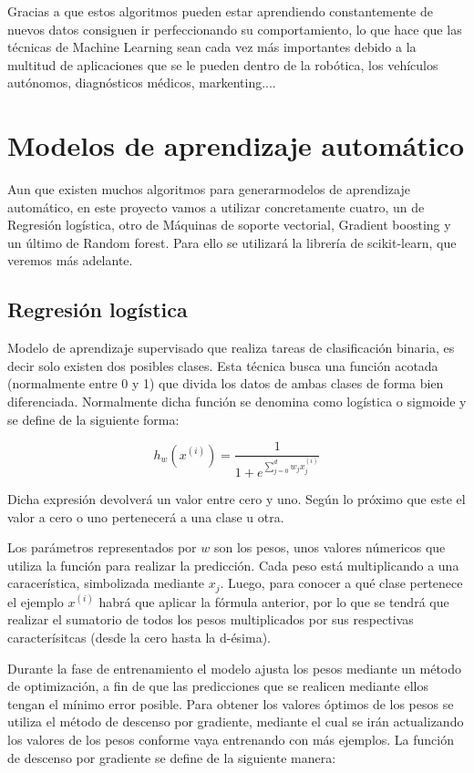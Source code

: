 \documentclass[a4paper, 12pt]{book}
\begin{document}
Gracias a que estos algoritmos pueden estar aprendiendo constantemente de nuevos datos consiguen ir perfeccionando su comportamiento, lo que hace que las técnicas de Machine Learning sean cada vez más importantes debido a la multitud de aplicaciones que se le pueden dentro de la robótica, los vehículos autónomos, diagnósticos médicos, markenting....

\section{Modelos de aprendizaje automático}
\label{sec:modelos_aautomatico}

Aun que existen muchos algoritmos para generarmodelos de aprendizaje automático, en este proyecto vamos a utilizar concretamente cuatro, un de Regresión logística, otro de Máquinas de soporte vectorial, Gradient boosting y un último de Random forest. Para ello se utilizará la librería de scikit-learn, que veremos más adelante.

\subsection{Regresión logística}
\label{subsec:regresion_logistica}

Modelo de aprendizaje supervisado que realiza tareas de clasificación binaria, es decir solo existen dos posibles clases. Esta técnica busca una función acotada (normalmente entre 0 y 1) que divida los datos de ambas clases de forma bien diferenciada. Normalmente dicha función se denomina como logística o sigmoide y se define de la siguiente forma:

\begin{equation}
    h_w(x^{(i)}) = \frac{1}{1 + e^{\sum_{j=0}^{d} w_j x_j^{(i)} }}
\end{equation}

Dicha expresión devolverá un valor entre cero y uno. Según lo próximo que este el valor a cero o uno pertenecerá a una clase u otra. 

Los parámetros representados por $w$ son los pesos, unos valores númericos que utiliza la función para realizar la predicción. Cada peso está multiplicando a una caracerística, simbolizada mediante $x_j$. Luego, para conocer a qué clase pertenece el ejemplo $x^{(i)}$ habrá que aplicar la fórmula anterior, por lo que se tendrá que realizar el sumatorio de todos los pesos multiplicados por sus respectivas caracterísitcas (desde la cero hasta la d-ésima). 

Durante la fase de entrenamiento el modelo ajusta los pesos mediante un método de optimización, a fin de que las predicciones que se realicen mediante ellos tengan el mínimo error posible. Para obtener los valores óptimos de los pesos se utiliza el método de descenso por gradiente, mediante el cual se irán actualizando los valores de los pesos conforme vaya entrenando con más ejemplos. La función de descenso por gradiente se define de la siguiente manera:
\end{document}
